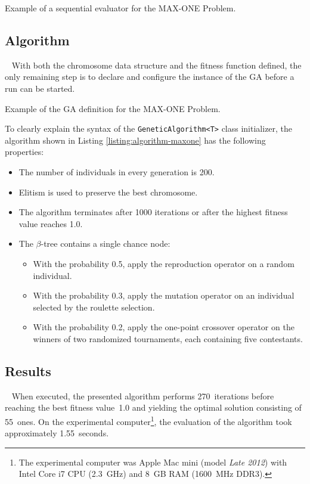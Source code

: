 \begin{listing}[ht]
	\caption{Example of a sequential evaluator for the MAX-ONE Problem.}
	\label{listing:evaluator-sequential-maxone}
\end{listing}

\subsection{Algorithm}~\label{section:maxone-algorithm}
With both the chromosome data structure and the fitness function defined, the only remaining step is to declare and configure the instance of the GA before a run can be started. 

\begin{listing}[ht]
	\caption{Example of the GA definition for the MAX-ONE Problem.}
	\label{listing:algorithm-maxone}
\end{listing}

To clearly explain the syntax of the \texttt{GeneticAlgorithm<T>} class initializer, the algorithm shown in Listing \ref{listing:algorithm-maxone} has the following properties:
~
\begin{itemize}
	\item The number of individuals in every generation is 200.
	\item Elitism is used to preserve the best chromosome.
	\item The algorithm terminates after 1000 iterations or after the highest fitness value reaches 1.0.
	\item The $\beta$-tree contains a single chance node:
	~
	\begin{itemize}
		\item With the probability 0.5, apply the reproduction operator on a random individual.
		\item With the probability 0.3, apply the mutation operator on an individual selected by the roulette selection.
		\item With the probability 0.2, apply the one-point crossover operator on the winners of two randomized tournaments, each containing five contestants.
	\end{itemize}
\end{itemize}

\subsection{Results}~\label{section:maxone-results}
When executed, the presented algorithm performs 270~iterations before reaching the best fitness value~1.0 and yielding the optimal solution consisting of 55~ones. On the experimental computer\footnote{The experimental computer was Apple Mac mini (model \textit{Late 2012}) with Intel Core i7 CPU (2.3~GHz) and 8~GB RAM (1600~MHz DDR3).}, the evaluation of the algorithm took approximately 1.55~seconds.

